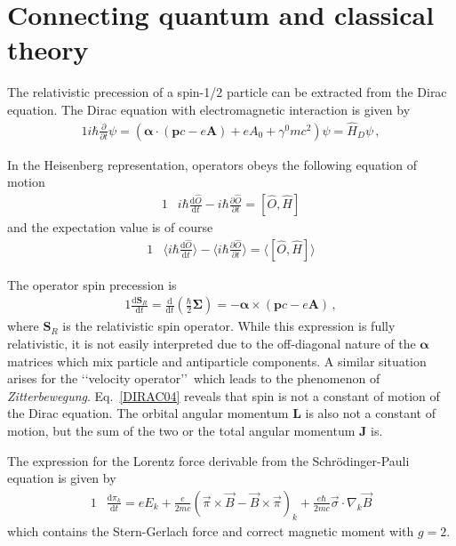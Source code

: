 \section{Connecting quantum and classical theory}
\label{sec:ehrenfest}
\noindent The relativistic precession of a spin-1/2 particle can be extracted from the Dirac equation. The Dirac equation with electromagnetic interaction is given by
\begin{alignat}{1}
  \label{DIRAC01} i\hbar\frac{\partial}{\partial t}\psi=\left(\boldsymbol{\alpha}\cdot\left(\mathbf{p}c-e\mathbf{A}\right)+eA_{0}+\gamma^{0}mc^{2}\right)\psi=\hat{H}_{D}\psi\,,
\end{alignat}

In the Heisenberg representation, operators obeys the following equation of motion
\begin{alignat}{1}
  \label{m06}		&i\hbar\frac{\mathrm{d}\hat{O}}{\mathrm{d}t}-i\hbar\frac{\partial\hat{O}}{\partial t}=[\hat{O},\hat{H}]
\end{alignat}
and the expectation value is of course
\begin{alignat}{1}
  \label{m07}		&\langle i\hbar\frac{\mathrm{d}\hat{O}}{\mathrm{d}t}\rangle-\langle i\hbar\frac{\partial\hat{O}}{\partial t}\rangle=\langle[\hat{O},\hat{H}]\rangle
\end{alignat}

The operator spin precession is
\begin{alignat}{1}
  \label{DIRAC04} \frac{\mathrm{d}\mathbf{S}_{R}}{\mathrm{d}t}=\frac{\mathrm{d}}{\mathrm{d}t}\left(\frac{\hbar}{2}\boldsymbol{\Sigma}\right)=-\boldsymbol{\alpha}\times\left(\mathbf{p}c-e\mathbf{A}\right)\,,
\end{alignat}
where $\mathbf{S}_{R}$ is the relativistic spin operator. While this expression is fully relativistic, it is not easily interpreted due to the off-diagonal nature of the $\boldsymbol{\alpha}$ matrices which mix particle and antiparticle components. A similar situation arises for the \lq\lq velocity operator\rq\rq\, which leads to the phenomenon of \emph{Zitterbewegung}. Eq.~\eqref{DIRAC04} reveals that spin is not a constant of motion of the Dirac equation. The orbital angular momentum $\mathbf{L}$ is also not a constant of motion, but the sum of the two or the total angular momentum $\mathbf{J}$ is.

The expression for the Lorentz force derivable from the Schr{\"o}dinger-Pauli equation is given by
\begin{alignat}{1}
  \label{m31}		&\frac{\mathrm{d}\pi_{k}}{\mathrm{d}t}=eE_{k}+\frac{e}{2mc}(\vec{\pi}\times\vec{B}-\vec{B}\times\vec{\pi})_{k}+\frac{e\hbar}{2mc}\vec{\sigma}\cdot\nabla_{k}\vec{B}
\end{alignat}
which contains the Stern-Gerlach force and correct magnetic moment with $g=2$.

